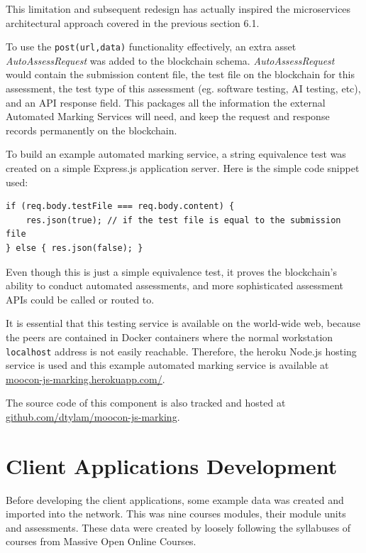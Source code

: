 This limitation and subsequent redesign has actually inspired the microservices architectural approach covered in the previous section 6.1.

To use the \texttt{post(url,data)} functionality effectively, an extra asset \textit{AutoAssessRequest} was added to the blockchain schema.
\textit{AutoAssessRequest} would contain the submission content file, the test file on the blockchain for this assessment, the test type of
this assessment (eg. software testing, AI testing, etc), and an API response field. This packages all the information the external
Automated Marking Services will need, and keep the request and response records permanently on the blockchain.

To build an example automated marking service, a string equivalence test was created on a simple Express.js application server.
Here is the simple code snippet used:
\begin{verbatim}
if (req.body.testFile === req.body.content) {
    res.json(true); // if the test file is equal to the submission file
} else { res.json(false); } 
\end{verbatim}

Even though this is just a simple equivalence test, it proves the blockchain's ability to conduct automated assessments, 
and more sophisticated assessment APIs could be called or routed to.

It is essential that this testing service is available on the world-wide web, because the peers are contained in Docker
containers where the normal workstation \texttt{localhost} address is not easily reachable. Therefore, the heroku Node.js 
hosting service is used and this example automated marking service is available at 
\href{https://moocon-js-marking.herokuapp.com/}{\underline{moocon-js-marking.herokuapp.com/}}.

The source code of this component is also tracked and hosted at 
\href{https://github.com/dtylam/moocon-js-marking}{\underline{github.com/dtylam/moocon-js-marking}}.

\section{Client Applications Development}

Before developing the client applications, some example data was created and imported into the network. 
This was nine courses modules, their module units and assessments. These data were created by loosely following 
the syllabuses of courses from Massive Open Online Courses.

